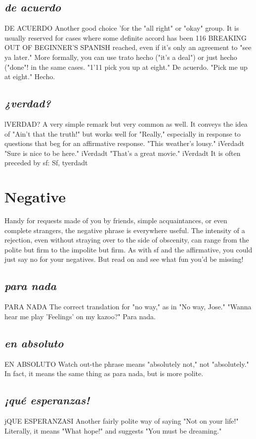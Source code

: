\documentclass[14pt,a4paper,oneside]{memoir}
\begin{document}
\subsection{\emph{de acuerdo}}
DE ACUERDO
Another good choice 'for the "all right" or "okay" group. It
is usually reserved for cases where some definite accord has been
116 BREAKING OUT OF BEGINNER'S SPANISH
reached, even if it's only an agreement to "see ya later." More formally,
you can use trato hecho ("it's a deal") or just hecho ("done"! in the
same cases. "1'11 pick you up at eight." De acuerdo. "Pick me up at
eight." Hecho.
\subsection{\emph{¿verdad?}}
lVERDAD?
A very simple remark but very common as well. It conveys the
idea of "Ain't that the truth!" but works well for "Really," especially
in response to questions that beg for an affirmative response. "This
weather's lousy." iVerdadt "Sure is nice to be here." iVerdadt "That's
a great movie." iVerdadt It is often preceded by sf: Sf, tyerdadt

\section{Negative}
Handy for requests made of you by friends, simple acquaintances, or even complete strangers, the negative phrase is everywhere
useful. The intensity of a rejection, even without straying over to the
side of obscenity, can range from the polite but firm to the impolite
but firm. As with sf and the affirmative, you could just say no for your
negatives. But read on and see what fun you'd be missing!
\subsection{\emph{para nada}}
PARA NADA
The correct translation for "no way," as in "No way, Jose."
"Wanna hear me play 'Feelings' on my kazoo?" Para nada.
\subsection{\emph{en absoluto}}
EN ABSOLUTO
Watch out-the phrase means "absolutely not," not "absolutely." In fact, it means the same thing as para nada, but is
more polite.
\subsection{\emph{¡qué esperanzas!}}
jQUE ESPERANZASI
Another fairly polite way of saying "Not on your life!" Literally, it means "What hope!" and suggests "You must be dreaming."
\end{document}
